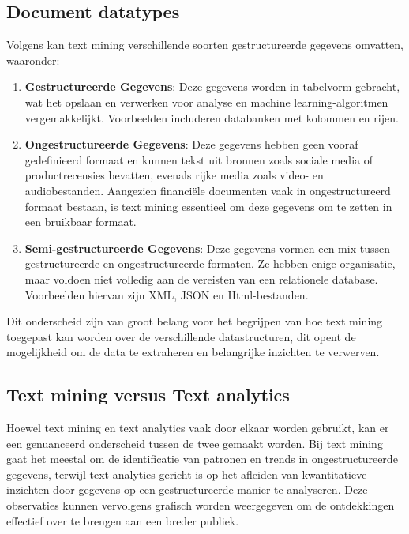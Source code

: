 \subsection{Document datatypes}
Volgens \autocite{AWS2024} kan text mining verschillende soorten gestructureerde gegevens omvatten, waaronder:

\begin{enumerate}
    \item \textbf{Gestructureerde Gegevens}: Deze gegevens worden in tabelvorm gebracht, wat het opslaan en verwerken voor analyse en machine learning-algoritmen vergemakkelijkt. Voorbeelden includeren databanken met kolommen en rijen.
    \item \textbf{Ongestructureerde Gegevens}: Deze gegevens hebben geen vooraf gedefinieerd formaat en kunnen tekst uit bronnen zoals sociale media of productrecensies bevatten, evenals rijke media zoals video- en audiobestanden. Aangezien financiële documenten vaak in ongestructureerd formaat bestaan, is text mining essentieel om deze gegevens om te zetten in een bruikbaar formaat.
    \item \textbf{Semi-gestructureerde Gegevens}: Deze gegevens vormen een mix tussen gestructureerde en ongestructureerde formaten. Ze hebben enige organisatie, maar voldoen niet volledig aan de vereisten van een relationele database. Voorbeelden hiervan zijn XML, JSON en Html-bestanden.
\end{enumerate}

Dit onderscheid zijn van groot belang voor het begrijpen van hoe text mining toegepast kan worden over de verschillende datastructuren, dit opent de mogelijkheid om de data te extraheren en belangrijke inzichten te verwerven.

\subsection{Text mining versus Text analytics}
Hoewel text mining en text analytics vaak door elkaar worden gebruikt, kan er een genuanceerd onderscheid tussen de twee gemaakt worden. Bij text mining gaat het meestal om de identificatie van patronen en trends in ongestructureerde gegevens, terwijl text analytics gericht is op het afleiden van kwantitatieve inzichten door gegevens op een gestructureerde manier te analyseren. Deze observaties kunnen vervolgens grafisch worden weergegeven om de ontdekkingen effectief over te brengen aan een breder publiek.\autocite{IBM2024}
